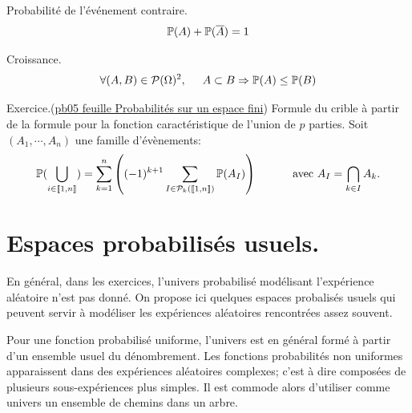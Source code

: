 Probabilité de l'événement contraire.
\begin{displaymath}
 \mathbb{P}(A) + \mathbb{P}(\overline{A}) = 1
\end{displaymath}

Croissance.
\begin{displaymath}
\forall (A,B)\in \mathcal{P}(\Omega)^2, \hspace{0.5cm} A\subset B \Rightarrow \mathbb{P}(A) \leq \mathbb{P}(B) 
\end{displaymath}

Exercice.(\href{\urlexo _fex_pb.pdf}{pb05 feuille Probabilités sur un espace fini}) Formule du crible à partir de la formule pour la fonction caractéristique de l'union de $p$ parties.
Soit $(A_1, \cdots, A_n)$ une famille d'évènements:
\[
 \mathbb{P}(\bigcup_{i \in \llbracket 1, n \rrbracket}) =
 \sum_{k=1}^{n}\left( (-1)^{k+1}\sum_{I \in \mathcal{P}_k(\llbracket 1, n \rrbracket)}\mathbb{P}(A_I)\right) 
 \hspace{1cm} \text{ avec } 
 A_I = \bigcap_{k \in I} A_k .
\]

\clearpage
\section{Espaces probabilisés usuels.}
En général, dans les exercices, l'univers probabilisé modélisant l'expérience aléatoire n'est pas donné. On propose ici quelques espaces probalisés usuels qui peuvent servir à modéliser les expériences aléatoires rencontrées assez souvent.

Pour une fonction probabilisé uniforme, l'univers est en général formé à partir d'un ensemble usuel du dénombrement. Les fonctions probabilités non uniformes apparaissent dans des expériences aléatoires complexes; c'est à dire composées de plusieurs sous-expériences plus simples. Il est commode alors d'utiliser comme univers un ensemble de chemins dans un arbre.

